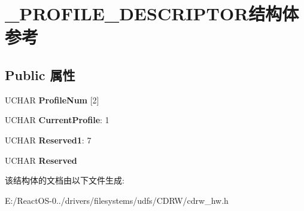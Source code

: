 \hypertarget{struct___p_r_o_f_i_l_e___d_e_s_c_r_i_p_t_o_r}{}\section{\+\_\+\+P\+R\+O\+F\+I\+L\+E\+\_\+\+D\+E\+S\+C\+R\+I\+P\+T\+O\+R结构体 参考}
\label{struct___p_r_o_f_i_l_e___d_e_s_c_r_i_p_t_o_r}
\subsection*{Public 属性}
\begin{DoxyCompactItemize}
\item 
\mbox{\label{struct___p_r_o_f_i_l_e___d_e_s_c_r_i_p_t_o_r_a7ab06fbcfc04b0eabfd26cb17657586b}} 
U\+C\+H\+AR {\bfseries Profile\+Num} \mbox{[}2\mbox{]}
\item 
\mbox{\label{struct___p_r_o_f_i_l_e___d_e_s_c_r_i_p_t_o_r_a1a7ba981c00cd2be6d411ba80abc2a77}} 
U\+C\+H\+AR {\bfseries Current\+Profile}\+: 1
\item 
\mbox{\label{struct___p_r_o_f_i_l_e___d_e_s_c_r_i_p_t_o_r_a98469f69d87f04f6a2f87d7fd10676dc}} 
U\+C\+H\+AR {\bfseries Reserved1}\+: 7
\item 
\mbox{\label{struct___p_r_o_f_i_l_e___d_e_s_c_r_i_p_t_o_r_af0589be9b710dc7c3ab1ebb7ee88d8fb}} 
U\+C\+H\+AR {\bfseries Reserved}
\end{DoxyCompactItemize}


该结构体的文档由以下文件生成\+:\begin{DoxyCompactItemize}
\item 
E\+:/\+React\+O\+S-\/0../drivers/filesystems/udfs/\+C\+D\+R\+W/cdrw\+\_\+hw.\+h\end{DoxyCompactItemize}
